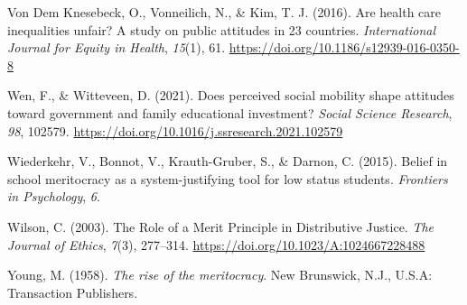 \documentclass[
  12pt,
]{article}
\newlength{\cslhangindent}
\newenvironment{CSLReferences}[2] %
 {\begin{list}{}{%
  \setlength{\itemindent}{0pt}
  \setlength{\leftmargin}{0pt}
  \setlength{\parsep}{0pt}
  \ifodd #1
   \setlength{\leftmargin}{\cslhangindent}
   \setlength{\itemindent}{-1\cslhangindent}
  \fi
  \setlength{\itemsep}{#2\baselineskip}}}
 {\end{list}}
\begin{document}
\begin{CSLReferences}{1}{0}
Von Dem Knesebeck, O., Vonneilich, N., \& Kim, T. J. (2016). Are health
care inequalities unfair? {A} study on public attitudes in 23 countries.
\emph{International Journal for Equity in Health}, \emph{15}(1), 61.
\url{https://doi.org/10.1186/s12939-016-0350-8}

Wen, F., \& Witteveen, D. (2021). Does perceived social mobility shape
attitudes toward government and family educational investment?
\emph{Social Science Research}, \emph{98}, 102579.
\url{https://doi.org/10.1016/j.ssresearch.2021.102579}

Wiederkehr, V., Bonnot, V., Krauth-Gruber, S., \& Darnon, C. (2015).
Belief in school meritocracy as a system-justifying tool for low status
students. \emph{Frontiers in Psychology}, \emph{6}.

Wilson, C. (2003). The {Role} of a {Merit Principle} in {Distributive
Justice}. \emph{The Journal of Ethics}, \emph{7}(3), 277--314.
\url{https://doi.org/10.1023/A:1024667228488}

Young, M. (1958). \emph{The rise of the meritocracy}. New Brunswick,
N.J., U.S.A: Transaction Publishers.

\end{CSLReferences}
\end{document}
